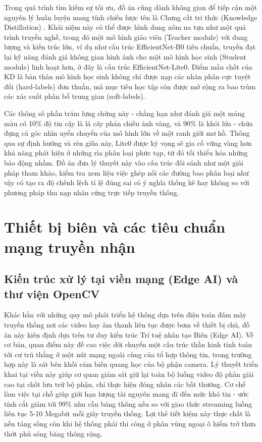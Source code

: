 \documentclass[12pt,a4paper]{report}
\begin{document}
Trong quá trình tìm kiếm sự tối ưu, đồ án cũng dành không gian để tiếp cận một nguyên lý huấn luyện mang tính chiến lược tên là Chưng cất tri thức (Knowledge Distillation) \cite{hinton2015distilling, gou2021survey}. Khái niệm này có thể được hình dung nôm na tựa như một quá trình truyền nghề, trong đó một mô hình giáo viên (Teacher module) với dung lượng và kiến trúc lớn, ví dụ như cấu trúc EfficientNet-B0 tiêu chuẩn, truyền đạt lại kỹ năng đánh giá không gian hình ảnh cho một mô hình học sinh (Student module) linh hoạt hơn, ở đây là cấu trúc EfficientNet-Lite0. Điểm mấu chốt của KD là bản thân mô hình học sinh không chỉ được nạp các nhãn phân cực tuyệt đối (hard-labels) đơn thuần, mà mục tiêu học tập còn được mở rộng ra bao trùm các xác suất phân bổ trung gian (soft-labels). 

Các thông số phần trăm lưng chừng này - chẳng hạn như đánh giá một mảng màu có 10\% độ tin cậy là lá cây phản chiếu ánh vàng, và 90\% là khói lửa - chứa đựng cả góc nhìn uyển chuyển của mô hình lớn về một ranh giới mơ hồ. Thông qua sự định hướng và rèn giũa này, Lite0 được kỳ vọng sẽ gia cố vững vàng hơn khả năng phát hiện ở những rìa phân loại phức tạp, từ đó tối thiểu hóa những báo động nhầm. Đồ án đưa lý thuyết này vào cấu trúc đối sánh như một giải pháp tham khảo, kiểm tra xem liệu việc ghép nối các đường bao phân loại như vậy có tạo ra độ chênh lệch tỉ lệ đúng sai có ý nghĩa thống kê hay không so với phương pháp thu nạp nhãn cứng trực tiếp truyền thống.

\section{Thiết bị biên và các tiêu chuẩn mạng truyền nhận}

\subsection{Kiến trúc xử lý tại viền mạng (Edge AI) và thư viện OpenCV}

Khác hẳn với những quy mô phát triển hệ thống dựa trên điện toán đám mây truyền thống nơi các video hay âm thanh liên tục được bơm về thiết bị chủ, đồ án này kiên định dựa trên tư duy kiến trúc Trí tuệ nhân tạo Biên (Edge AI). Về cơ bản, quan điểm này đề cao việc dời chuyển một cấu trúc thần kinh tính toán tới cư trú thẳng ở một nút mạng ngoài cùng của tổ hợp thông tin, trong trường hợp này là sát bên khối cảm biến quang học của bộ phận camera. Lý thuyết triển khai tại viền này giúp cơ quan giám sát giữ lại toàn bộ luồng video độ phân giải cao tại chốt lưu trữ bộ phận, chỉ thực hiện đóng nhãn các bất thường. Cơ chế làm việc tại chỗ giúp giới hạn lượng tài nguyên mang đi đến mức khó tin - ước tính cắt giảm tới 99\% nhu cầu băng thông nếu so với giao thức streaming luồng liên tục 5-10 Megabit mỗi giây truyền thống. Lợi thế tiết kiệm này thực chất là nền tảng sống còn khi hệ thống phải thi công ở phân vùng ngoại ô hiểm trở thưa thớt phủ sóng băng thông rộng.
\end{document}
